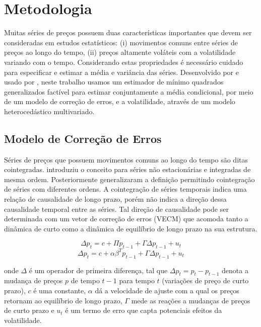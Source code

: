 \section{Metodologia}

 Muitas séries de preços  possuem duas características importantes que devem ser consideradas em estudos estatísticos: (i) movimentos comuns entre séries de preços ao longo do tempo, (ii) preços altamente voláteis com a volatilidade variando com o tempo. Considerando estas propriedades  é necessário cuidado para especificar e estimar a média e variância das séries.  Desenvolvido por  e  usado por , neste trabalho usamos um estimador de mínimo quadrados generalizados factível para  estimar conjuntamente a média condicional, por meio de um modelo de correção de erros, e a  volatilidade, através de um modelo heterocedástico multivariado.
 
 
 \subsection{Modelo de Correção de Erros} 
 
 
 Séries de preços que possuem movimentos comuns ao longo do tempo são ditas cointegradas.  introduziu o conceito para séries não estacionárias e integradas de mesma ordem. Posteriormente   generalizaram a definição permitindo cointegração de séries com diferentes ordens. A  cointegração de séries temporais indica uma relação de causalidade de longo prazo, porém não indica a direção dessa causalidade temporal entre as séries. Tal direção de causalidade pode ser determinada com um vetor de correção de erros (VECM) que acomoda  tanto a dinâmica de curto como a dinâmica de equilíbrio de longo prazo na sua estrutura.
 
  \begin{equation}
  \Delta p_{t} =c+\Pi p_{t-1} + \Gamma \Delta p_{t-1}+u_t
  \end{equation}
  \begin{equation}
 \Delta p_{t} = c+\alpha \beta ^T  p_{t-1} + \Gamma \Delta p_{t-1}+u_t
\end{equation}
 
  onde $\Delta$ é um operador de primeira diferença, tal que $\Delta p_{t} = p_t-p_{t - 1}$ denota a mudança de preços $p$ de tempo $t-1$ para tempo $t$ (variações de preço de curto prazo), $c$ é uma constante, $\alpha$ dá a velocidade de ajuste com a qual os preços retornam ao equilíbrio de longo prazo, $\Gamma$ mede as reações a mudanças de preços de curto prazo e $u_t$ é um termo de erro que capta potenciais efeitos da volatilidade.
  
